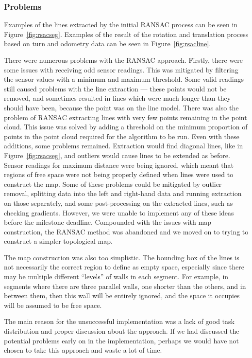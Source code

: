 \documentclass[10pt,a4paper,twocolumn]{article}
\begin{document}
\subsubsection{Problems}
Examples of the lines extracted by the initial RANSAC process can be seen in
Figure~\ref{fig:rsacseg}. Examples of the result of the rotation and translation
process based on turn and odometry data can be seen in
Figure~\ref{fig:rsacline}.

There were numerous problems with the RANSAC approach. Firstly, there were some
issues with receiving odd sensor readings. This was mitigated by filtering the
sensor values with a minimum and maximum threshold. Some valid readings still
caused problems with the line extraction --- these points would not be removed,
and sometimes resulted in lines which were much longer than they should have
been, because the point was on the line model. There was also the problem of
RANSAC extracting lines with very few points remaining in the point cloud. This
issue was solved by adding a threshold on the minimum proportion of points in
the point cloud required for the algorithm to be run. Even with these additions,
some problems remained. Extraction would find diagonal lines, like in
Figure~\ref{fig:rsacseg}, and outliers would cause lines to be extended as
before. Sensor readings for maximum distance were being ignored, which meant
that regions of free space were not being properly defined when lines were used
to construct the map. Some of these problems could be mitigated by outlier
removal, splitting data into the left and right-hand data and running extraction
on those separately, and some post-processing on the extracted lines, such as
checking gradients. However, we were unable to implement any of these ideas
before the milestone deadline. Compounded with the issues with map construction,
the RANSAC method was abandoned and we moved on to trying to construct a simpler
topological map.

The map construction was also too simplistic. The bounding box of the lines is
not necessarily the correct region to define as empty space, especially since
there may be multiple different ``levels'' of walls in each segment. For
example, in segments where there are three parallel walls, one shorter than the
others, and in between them, then this wall will be entirely ignored, and the
space it occupies will be assumed to be free space.

The main reason for the unsuccessful implementation was a lack of good task
distribution and proper discussion about the approach. If we had discussed the
potential problems early on in the implementation, perhaps we would have not
chosen to take this approach and waste a lot of time.
\end{document}
